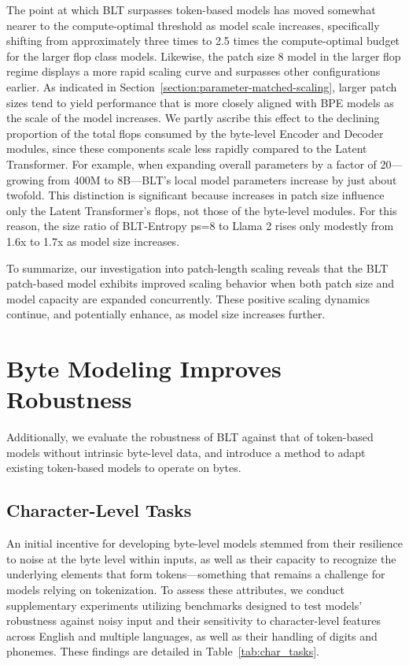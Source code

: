 The point at which {\textsc BLT} surpasses token-based models has moved somewhat nearer to the compute-optimal threshold as model scale increases, specifically shifting from approximately three times to 2.5 times the compute-optimal budget for the larger flop class models. Likewise, the patch size 8 model in the larger flop regime displays a more rapid scaling curve and surpasses other configurations earlier. As indicated in Section~\ref{section:parameter-matched-scaling}, larger patch sizes tend to yield performance that is more closely aligned with BPE models as the scale of the model increases. We partly ascribe this effect to the declining proportion of the total flops consumed by the byte-level Encoder and Decoder modules, since these components scale less rapidly compared to the Latent Transformer. For example, when expanding overall parameters by a factor of 20—growing from 400M to 8B—{\textsc BLT}'s local model parameters increase by just about twofold. This distinction is significant because increases in patch size influence only the Latent Transformer's flops, not those of the byte-level modules. For this reason, the size ratio of {\textsc BLT}-Entropy ps=8 to Llama 2 rises only modestly from 1.6x to 1.7x as model size increases.

To summarize, our investigation into patch-length scaling reveals that the {\textsc BLT} patch-based model exhibits improved scaling behavior when both patch size and model capacity are expanded concurrently. These positive scaling dynamics continue, and potentially enhance, as model size increases further.

\section{Byte Modeling Improves Robustness} Additionally, we evaluate the robustness of {\textsc BLT} against that of token-based models without intrinsic byte-level data, and introduce a method to adapt existing token-based models to operate on bytes.
\label{sec:robustness}

\subsection{Character-Level Tasks}

An initial incentive for developing byte-level models stemmed from their resilience to noise at the byte level within inputs, as well as their capacity to recognize the underlying elements that form tokens—something that remains a challenge for models relying on tokenization. To assess these attributes, we conduct supplementary experiments utilizing benchmarks designed to test models' robustness against noisy input and their sensitivity to character-level features across English and multiple languages, as well as their handling of digits and phonemes. These findings are detailed in Table~\ref{tab:char_tasks}.

